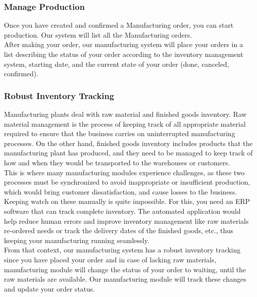 \subsubsection{Manage Production}
Once you have created and confirmed a Manufacturing order, you can start production. Our system
will list all the Manufacturing orders.\\
After making your order, our manufacturing system will place your orders in a list describing the
status of your order according to the inventory management system, starting date, and the current state
of your order (done, canceled, confirmed).
\subsubsection{Robust Inventory Tracking}
Manufacturing plants deal with raw material and finished goods inventory. Raw material management
is the process of keeping track of all appropriate material required to ensure that the business carries
on uninterrupted manufacturing processes. On the other hand, finished goods inventory includes
products that the manufacturing plant has produced, and they need to be managed to keep track of
how and when they would be transported to the warehouses or customers.\\
This is where many manufacturing modules experience challenges, as these two processes must be
synchronized to avoid inappropriate or insufficient production, which would bring customer
dissatisfaction, and cause losses to the business.\\
Keeping watch on these manually is quite impossible. For this, you need an ERP software that can
track complete inventory. The automated application would help reduce human errors and improve
inventory management like raw materials re-ordered needs or track the delivery dates of the finished
goods, etc., thus keeping your manufacturing running seamlessly.\\
From that context, our manufacturing system has a robust inventory tracking since you have placed
your order and in case of lacking raw materials, manufacturing module will change the status of your
order to waiting, until the raw materials are available. Our manufacturing module will track these
changes and update your order status.

